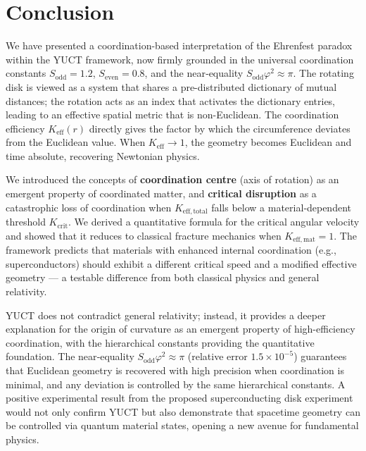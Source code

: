 \documentclass[12pt,a4paper]{article}
\newcommand{\Sodd}{S_{\mathrm{odd}}}
\newcommand{\Seven}{S_{\mathrm{even}}}
\begin{document}
	\section{Conclusion}
	\label{sec:conclusion}
	
	We have presented a coordination-based interpretation of the Ehrenfest paradox within the YUCT framework, now firmly grounded in the universal coordination constants \(\Sodd = 1.2\), \(\Seven = 0.8\), and the near‑equality \(\Sodd \varphi^2 \approx \pi\). The rotating disk is viewed as a system that shares a pre-distributed dictionary of mutual distances; the rotation acts as an index that activates the dictionary entries, leading to an effective spatial metric that is non-Euclidean. The coordination efficiency \(K_{\mathrm{eff}}(r)\) directly gives the factor by which the circumference deviates from the Euclidean value. When \(K_{\mathrm{eff}} \to 1\), the geometry becomes Euclidean and time absolute, recovering Newtonian physics.
	
	We introduced the concepts of \textbf{coordination centre} (axis of rotation) as an emergent property of coordinated matter, and \textbf{critical disruption} as a catastrophic loss of coordination when \(K_{\mathrm{eff,total}}\) falls below a material‑dependent threshold \(K_{\mathrm{crit}}\). We derived a quantitative formula for the critical angular velocity and showed that it reduces to classical fracture mechanics when \(K_{\mathrm{eff,mat}}=1\). The framework predicts that materials with enhanced internal coordination (e.g., superconductors) should exhibit a different critical speed and a modified effective geometry — a testable difference from both classical physics and general relativity.
	
	YUCT does not contradict general relativity; instead, it provides a deeper explanation for the origin of curvature as an emergent property of high-efficiency coordination, with the hierarchical constants providing the quantitative foundation. The near‑equality \(\Sodd \varphi^2 \approx \pi\) (relative error \(1.5\times10^{-5}\)) guarantees that Euclidean geometry is recovered with high precision when coordination is minimal, and any deviation is controlled by the same hierarchical constants. A positive experimental result from the proposed superconducting disk experiment would not only confirm YUCT but also demonstrate that spacetime geometry can be controlled via quantum material states, opening a new avenue for fundamental physics.
	
\end{document}
